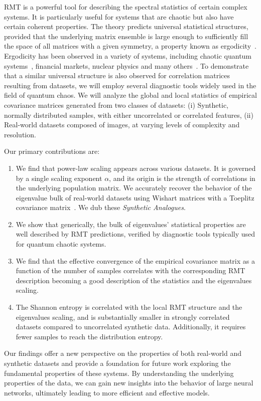 \documentclass{article}
\begin{document}
RMT is a powerful tool for describing the spectral statistics of certain complex systems. It is particularly useful for systems that are chaotic but also have certain coherent properties. The theory predicts universal statistical structures, provided that the underlying matrix ensemble is large enough to sufficiently fill the space of all matrices with a given symmetry, a property known as ergodicity~\citep{Guhr_1998}. Ergodicity has been observed in a variety of systems, including chaotic quantum systems~\citep{bohigas1984characterization,mehta1991random,pandey1983random}, financial markets, nuclear physics and many others~\citep{plerou1999random,brody1981random,efetov1997supersymmetry}. 
To demonstrate that a similar universal structure is also observed for correlation matrices resulting from datasets, we will employ several diagnostic tools widely used in the field of quantum chaos. We will analyze the global and local statistics of empirical covariance matrices generated from two classes of datasets: (i) Synthetic, normally distributed samples, with either uncorrelated or correlated features, (ii) Real-world datasets composed of images, at varying levels of complexity and resolution.

Our primary contributions are:
\vspace{-.1cm}
\begin{enumerate}
    \item 
    We find that power-law scaling appears across various datasets. It is governed by a single scaling exponent $\alpha$, and its origin is the strength of correlations in the underlying population matrix.
    We accurately recover the behavior of the eigenvalue bulk of real-world datasets using Wishart matrices with a Toeplitz covariance matrix~\cite{CIT-006}. We dub these {\it Synthetic Analogues}.
    \item 
    We show that generically, the bulk of eigenvalues'
    statistical properties are well described by RMT predictions, verified by diagnostic tools typically used for quantum chaotic systems.
    \item 
    We find that the effective convergence of the empirical covariance matrix as a function of the number of samples correlates with the corresponding RMT description becoming a good description of the statistics and the eigenvalues scaling.
    \item 
    The Shannon entropy is correlated with the local RMT structure and the eigenvalues scaling, and is substantially smaller in strongly correlated datasets compared to uncorrelated synthetic data. Additionally, it requires fewer samples to reach the distribution entropy.
\end{enumerate}
\vspace{-.2cm}
Our findings offer a new perspective on the properties of both real-world and synthetic datasets and provide a foundation for future work exploring the fundamental properties of these systems. By understanding the underlying properties of the data, we can gain new insights into the behavior of large neural networks, ultimately leading to more efficient and effective models.
\end{document}
